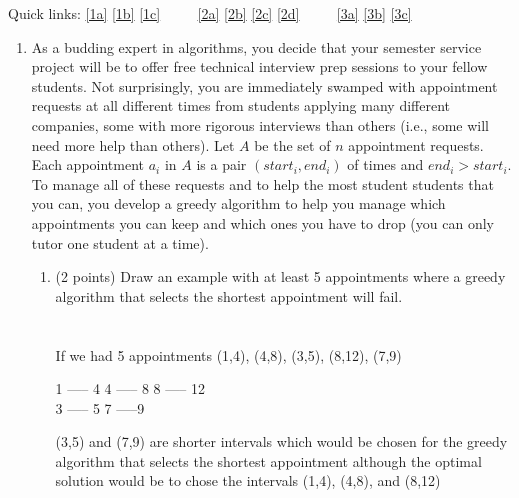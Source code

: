 \documentclass[12pt]{article}
\begin{document}
\renewcommand{\headrulewidth}{0.5pt}
\phantom{Test}

Quick links: \ref{1a} \ref{1b} \ref{1c} $\qquad$ \ref{2a} \ref{2b} \ref{2c} \ref{2d} $\qquad$ \ref{3a} \ref{3b} \ref{3c} 

\vspace{-3mm}
\begin{enumerate}

\item %
As a budding expert in algorithms, you decide that your semester service
project will be to offer free technical interview prep sessions to your fellow
students. Not surprisingly, you are immediately swamped with appointment
requests at all different times from students applying many
different companies, some with more rigorous interviews than others
(i.e., some will need more help than others). Let $A$ be the set of $n$
appointment requests. Each appointment $a_i$ in $A$ is a pair 
$(start_i, end_i)$ of times and $end_i>start_i$. To manage all of these
requests and to help the most student students that you can, you
develop a greedy algorithm to help you manage which appointments you can keep
and which ones you have to drop (you can only tutor one student at a
time).  

\pagebreak
\begin{enumerate}
    \item \label{1a} (2 points) Draw an example with at least 5 appointments where a greedy algorithm
    that selects the shortest appointment will fail. 
 \\
 \\
 \\If we had 5 appointments {(1,4), (4,8), (3,5), (8,12), (7,9)}
 \begin{center} 1 ----- 4 4 ----- 8 8 ----- 12 \\ 3 ----- 5  7 -----9 \end{center}
  (3,5) and (7,9) are shorter intervals which would be chosen for the greedy algorithm that selects the shortest appointment although the optimal solution would be to chose the intervals (1,4), (4,8), and (8,12)
 


\end{enumerate}
\end{enumerate}
\end{document}
